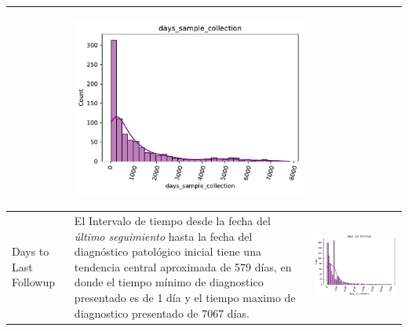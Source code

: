 \begin{table}[!htb]
\begin{threeparttable}
\begin{tabular}{p{2.5cm} p{7cm} p{6.5cm}}
			& \begin{center}\includegraphics[width=1\linewidth]{NOTEBOOK/IMAGENES_DESCRIPTIVAS/7_days_sample_collection}\end{center}
			\\ \hline
			Days to Last Followup
			& El Intervalo de tiempo desde la fecha del \textit{último seguimiento} hasta la fecha del diagnóstico patológico inicial tiene una tendencia central aproximada de 579 días, en donde el tiempo mínimo de diagnostico  presentado es de 1 día y el tiempo maximo de diagnostico presentado de 7067 días.
			
			& \begin{center}\includegraphics[width=1\linewidth]{NOTEBOOK/IMAGENES_DESCRIPTIVAS/8_days_last_followup}\end{center}
			\\ \hline
		\end{tabular}
	\end{threeparttable}
\end{table}


